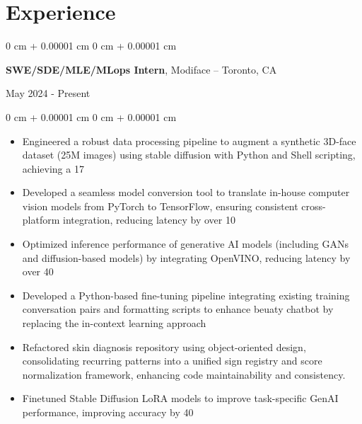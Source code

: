 \documentclass[11pt, letterpaper]{article}
\newenvironment{highlights}{
    \begin{itemize}[
        topsep=0.08 cm,
        parsep=0.08 cm,
        partopsep=0pt,
        itemsep=0pt,
        leftmargin=0.2 cm + 17pt
    ]
}
{
    \end{itemize}
}
\newenvironment{onecolentry}{
    \begin{adjustwidth}{
        0 cm + 0.00001 cm
    }{
        0 cm + 0.00001 cm
    }
}{
    \end{adjustwidth}
}
\newenvironment{twocolentry}[2][]{
    \onecolentry
    \def\secondColumn{#2}
    \setcolumnwidth{\fill, 4.5 cm}
    \begin{paracol}{2}
}{
    \switchcolumn \raggedleft \secondColumn
    \end{paracol}
    \endonecolentry
}
\begin{document}
\section{Experience}
\vspace{0.08 cm}
\begin{twocolentry}{\footnotesize May 2024 - Present}
    {\textbf{SWE/SDE/MLE/MLops Intern}}, Modiface -- Toronto, CA
\end{twocolentry}
\vspace{0.05 cm}
\begin{onecolentry}
    \begin{highlights}
        \item Engineered a robust data processing pipeline to augment a synthetic 3D-face dataset (25M images) using  stable diffusion with Python and Shell scripting, achieving a 17%
        \item Developed a seamless model conversion tool to translate in-house computer vision models from PyTorch to TensorFlow, ensuring consistent cross-platform integration, reducing latency by over 10%
        \item Optimized inference performance of generative AI models (including GANs and diffusion-based models) by integrating OpenVINO, reducing latency by over 40%
        \item Developed a Python-based fine-tuning pipeline integrating existing training conversation pairs and formatting scripts to enhance beuaty chatbot by replacing the in-context learning approach
        \item Refactored skin diagnosis repository using object-oriented design, consolidating recurring patterns into a unified sign registry and score normalization framework, enhancing code maintainability and consistency.
        \item Finetuned Stable Diffusion LoRA models to improve task-specific GenAI performance, improving accuracy by 40%
    \end{highlights}
\end{onecolentry}
\vspace{0.15 cm}
\end{document}
